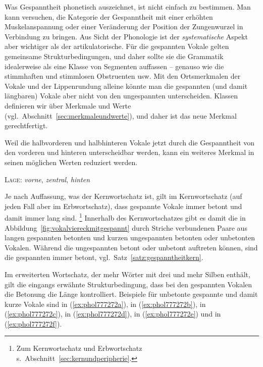 Was Gespanntheit phonetisch auszeichnet, ist nicht einfach zu bestimmen.
Man kann versuchen, die Kategorie der Gespanntheit mit einer erhöhten Muskelanspannung oder einer Veränderung der Position der Zungenwurzel in Verbindung zu bringen.
Aus Sicht der Phonologie ist der \textit{systematische} Aspekt aber wichtiger als der artikulatorische.
Für die gespannten Vokale gelten gemeinsame Strukturbedingungen, und daher sollte sie die Grammatik idealerweise als eine Klasse von Segmenten auffassen -- genauso wie die stimmhaften und stimmlosen Obstruenten usw.
Mit den Ortsmerkmalen der Vokale und der Lippenrundung alleine könnte man die gespannten (und damit längbaren) Vokale aber nicht von den ungespannten unterscheiden.
Klassen definieren wir über Merkmale und Werte (vgl.\ Abschnitt~\ref{sec:merkmaleundwerte}), und daher ist das neue Merkmal gerechtfertigt.


Weil die halbvorderen und halbhinteren Vokale jetzt durch die Gespanntheit von den vorderen und hinteren unterscheidbar werden, kann ein weiteres Merkmal in seinen möglichen Werten reduziert werden.

\begin{exe}
  \ex \textsc{Lage}: \textit{vorne}, \textit{zentral}, \textit{hinten}
\end{exe}

Je nach Auffassung, was der Kernwortschatz ist, gilt im Kernwortschatz (auf jeden Fall aber im Erbwortschatz), dass gespannte Vokale immer betont und damit immer lang sind.%
\footnote{Zum Kernwortschatz und Erbwortschatz s.\ Abschnitt~\ref{sec:kernundperipherie}.}
Innerhalb des Kernwortschatzes gibt es damit die in Abbildung~\ref{fig:vokalviereckmitgespannt} durch Striche verbundenen Paare aus langen gespannten betonten und kurzen ungespannten betonten oder unbetonten Vokalen.
Während die ungespannten betont oder unbetont auftreten können, sind die gespannten immer betont, vgl.\ Satz~\ref{satz:gespanntheitkern}.


Im erweiterten Wortschatz, der mehr Wörter mit drei und mehr Silben enthält, gilt die eingangs erwähnte Strukturbedingung, dass bei den gespannten Vokalen die Betonung die Länge kontrolliert.
Beispiele für unbetonte gespannte und damit kurze Vokale sind \textipa{[i]} in (\ref{ex:phol777272a}), \textipa{[e]} in (\ref{ex:phol777272b}), \textipa{[u]} in (\ref{ex:phol777272c}), \textipa{[o]} in (\ref{ex:phol777272d}), \textipa{[\o]} in (\ref{ex:phol777272e}) und \textipa{[y]} in (\ref{ex:phol777272f}).


